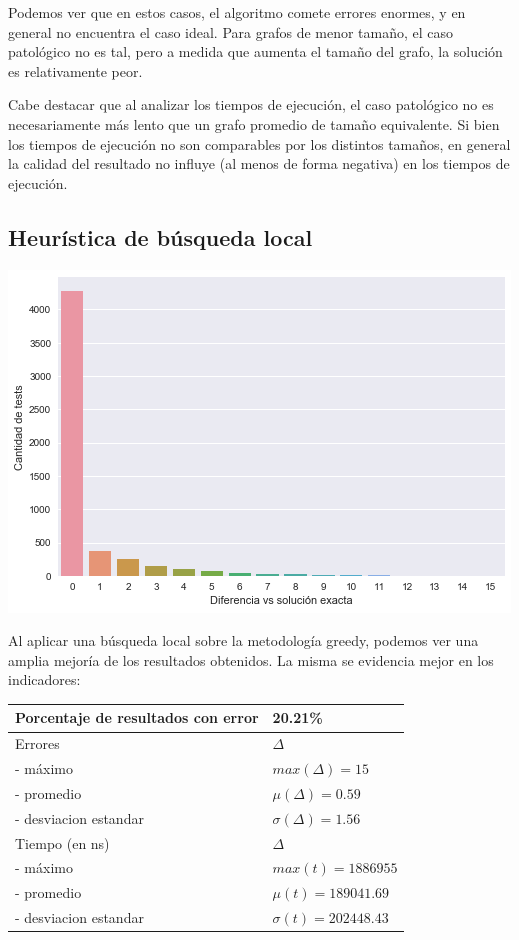 Podemos ver que en estos casos, el algoritmo comete errores enormes, y en general no encuentra el caso ideal. Para grafos de menor tamaño, el caso patológico no es tal, pero a medida que aumenta el tamaño del grafo, la solución es relativamente peor.

Cabe destacar que al analizar los tiempos de ejecución, el caso patológico no es necesariamente más lento que un grafo promedio de tamaño equivalente. Si bien los tiempos de ejecución no son comparables por los distintos tamaños, en general la calidad del resultado no influye (al menos de forma negativa) en los tiempos de ejecución. 

\subsection{Heurística de búsqueda local}

\begin{center}
    \includegraphics[scale=0.6]{img/accuracy-local.png}
\end{center}

Al aplicar una búsqueda local sobre la metodología greedy, podemos ver una amplia mejoría de los resultados obtenidos. La misma se evidencia mejor en los indicadores:

\begin{center}
    \begin{tabular}{ | l l |}
        \hline
        Porcentaje de resultados con error & 20.21\% \\ \hline
        Errores & $\Delta$ \\
        - máximo & $max(\Delta) = 15$ \\
        - promedio & $\mu(\Delta) = 0.59$ \\
        - desviacion estandar & $\sigma(\Delta) = 1.56$ \\ \hline
        Tiempo (en ns) & $\Delta$ \\
        - máximo & $max(t) = 1886955 $ \\
        - promedio & $\mu(t) = 189041.69$ \\
        - desviacion estandar & $\sigma(t) = 202448.43$ \\
        \hline
    \end{tabular}
\end{center}

